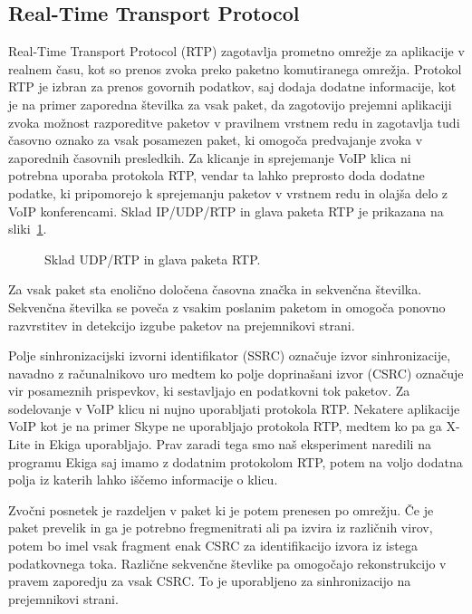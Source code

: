 \documentclass{acm_proc_article-sp}
\begin{document}
\subsection{Real-Time Transport Protocol}

Real-Time Transport Protocol (RTP) zagotavlja prometno omrežje za aplikacije v realnem času, kot so prenos zvoka preko paketno komutiranega omrežja. Protokol RTP je izbran za prenos govornih podatkov, saj dodaja dodatne informacije, kot je na primer zaporedna številka za vsak paket, da zagotovijo prejemni aplikaciji zvoka možnost razporeditve paketov v pravilnem vrstnem redu in zagotavlja tudi časovno oznako za vsak posamezen paket, ki omogoča predvajanje zvoka v zaporednih časovnih presledkih. Za klicanje in sprejemanje VoIP klica ni potrebna uporaba protokola RTP, vendar ta lahko preprosto doda dodatne podatke, ki pripomorejo k sprejemanju paketov v vrstnem redu in olajša delo z VoIP konferencami. Sklad IP/UDP/RTP in glava paketa RTP je prikazana na sliki~\ref{fig:ip-udp-rtp}.

\begin{figure}
\centering
{} %
\caption{Sklad UDP/RTP in glava paketa RTP.}
\label{fig:ip-udp-rtp}
\end{figure}

Za vsak paket sta enolično določena časovna značka in sekv\-enčna številka. Sekvenčna številka se poveča z vsakim poslanim paketom in omogoča ponovno razvrstitev in detekcijo izgube paketov na prejemnikovi strani.

Polje sinhronizacijski izvorni identifikator (SSRC) označuje izvor sinhronizacije, navadno z računalnikovo uro medtem ko polje doprinašani izvor (CSRC) označuje vir posameznih prispevkov, ki sestavljajo en podatkovni tok paketov. Za sodelovanje v VoIP klicu ni nujno uporabljati protokola RTP. Nekatere aplikacije VoIP kot je na primer Skype ne uporabljajo protokola RTP, medtem ko pa ga X-Lite in Ekiga uporabljajo. Prav zaradi tega smo naš eksperiment naredili na programu Ekiga saj imamo z dodatnim protokolom RTP, potem na voljo dodatna polja iz katerih lahko iščemo informacije o klicu.

Zvočni posnetek je razdeljen v paket ki je potem prenesen po omrežju. Če je paket prevelik in ga je potrebno fregmenitrati ali pa izvira iz različnih virov, potem bo imel vsak fragment enak CSRC za identifikacijo izvora iz istega podatkovnega toka. Različne sekvenčne števlike pa omogočajo rekonstrukcijo v pravem zaporedju za vsak CSRC. To je uporabljeno za sinhronizacijo na prejemnikovi strani.
\end{document}
